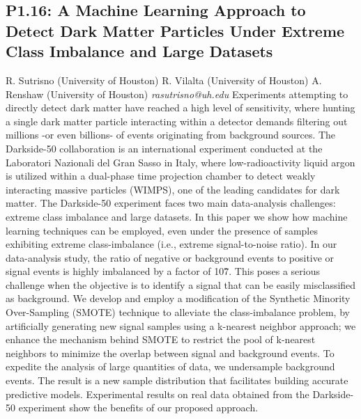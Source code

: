 \documentclass{report}
\begin{document}
\subsection*{P1.16: A Machine Learning Approach to Detect Dark Matter Particles Under Extreme Class Imbalance and Large Datasets}
\bigskip
R. Sutrisno (University of Houston) \newline R. Vilalta (University of Houston) \newline  A. Renshaw (University of Houston)\newline   \newline  \newline  \newline\newline
{\it rasutrisno@uh.edu}\newline
\newline\newline
Experiments attempting to directly detect dark matter have reached a high level of sensitivity, where hunting a single dark matter particle interacting within a detector demands filtering out millions -or even billions- of events originating from background sources.  The Darkside-50 collaboration is an international experiment conducted at the Laboratori Nazionali del Gran Sasso in Italy, where low-radioactivity liquid argon is utilized within a dual-phase time projection chamber to detect weakly interacting massive particles (WIMPS), one of the leading candidates for dark matter. The Darkside-50 experiment faces two main data-analysis challenges: extreme class imbalance and large datasets. In this paper we show how machine learning techniques can be employed, even under the presence of samples exhibiting extreme class-imbalance (i.e., extreme signal-to-noise ratio). In our data-analysis study, the ratio of negative or background events to positive or signal events is highly imbalanced by a factor of 10\^7. This poses a serious challenge when the objective is to identify a signal that can be easily misclassified as background. We develop and employ a modification of the Synthetic Minority Over-Sampling (SMOTE) technique to alleviate the class-imbalance problem, by artificially generating new signal samples using a k-nearest neighbor approach; we enhance the mechanism behind SMOTE to restrict the pool of k-nearest neighbors to minimize the overlap between signal and background events. To expedite the analysis of large quantities of data, we undersample background events. The result is a new sample distribution that facilitates building accurate predictive models. Experimental results on real data obtained from the Darkside-50 experiment show the benefits of our proposed approach.\newline
\newpage
\end{document}
